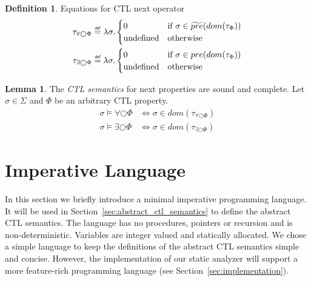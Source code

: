 \documentclass[11pt,a4paper,titlepage]{article}
\theoremstyle{definition}
\newtheorem{definition}{Definition}[section]
\newtheorem{lemma}[theorem]{Lemma}
\newcommand\eqdef{\mathrel{\overset{\makebox[0pt]{\mbox{\normalfont\tiny\sffamily def}}}{=}}}
\begin{document}
\begin{definition}\label{def:ctl_semantics_next}
    Equations for CTL next operator
    \setlength{\jot}{15pt}
    \begin{align}
        \tau_{\forall\bigcirc\Phi} &\eqdef \lambda \sigma.
        \begin{cases}
            0                   & \text{if} \ \sigma \in \widetilde{pre}(dom(\tau_\Phi)) \\
            \text{undefined}    & \text{otherwise}
        \end{cases}\\
        \tau_{\exists\bigcirc\Phi} &\eqdef \lambda \sigma.
        \begin{cases}
            0                   & \text{if} \ \sigma \in pre(dom(\tau_\Phi)) \\
            \text{undefined}    & \text{otherwise}
        \end{cases}
    \end{align}
\end{definition}

\begin{lemma}\label{lem:ctl_semantics_next}
    The \textit{CTL semantics} for \textsf{next} properties are sound and complete. 
    Let $\sigma \in \Sigma$ and $\Phi$ be an arbitrary CTL property.
    \begin{align}
        \sigma \models \forall\bigcirc\Phi &\iff \sigma \in dom(\tau_{\forall\bigcirc\Phi})\\
        \sigma \models \exists\bigcirc\Phi &\iff \sigma \in dom(\tau_{\exists\bigcirc\Phi})
    \end{align}
\end{lemma}


\section{Imperative Language}\label{sec:imperative_language}

In this section we briefly introduce a minimal imperative programming language. 
It will be used in Section~\ref{sec:abstract_ctl_semantics} to define the abstract CTL semantics.
The language has no procedures, pointers or recursion and is non-deterministic.
Variables are integer valued and statically allocated. We chose a simple language to 
keep the definitions of the abstract CTL semantics simple and concise. 
However, the implementation of our static analyzer 
will support a more feature-rich programming language (see Section~\ref{sec:implementation}).\\
\end{document}
